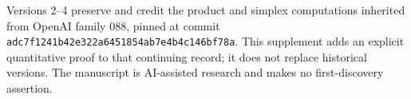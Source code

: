 \documentclass[
  11pt,
]{article}
\begin{document}
Versions 2--4 preserve and credit the product and simplex computations
inherited from OpenAI family 088, pinned at commit
\texttt{adc7f1241b42e322a6451854ab7e4b4c146bf78a}. This supplement adds
an explicit quantitative proof to that continuing record; it does not
replace historical versions. The manuscript is AI-assisted research and
makes no first-discovery assertion.
\end{document}
